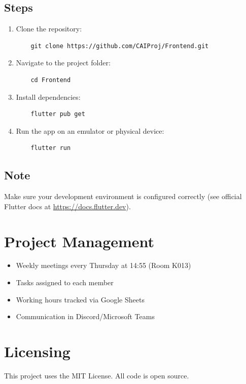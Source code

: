 \documentclass[12pt]{article}
\begin{document}
\subsection*{Steps}
\begin{enumerate}
    \item Clone the repository:
    \begin{verbatim}
    git clone https://github.com/CAIProj/Frontend.git
    \end{verbatim}
    \item Navigate to the project folder:
    \begin{verbatim}
    cd Frontend
    \end{verbatim}
    \item Install dependencies:
    \begin{verbatim}
    flutter pub get
    \end{verbatim}
    \item Run the app on an emulator or physical device:
    \begin{verbatim}
    flutter run
    \end{verbatim}
\end{enumerate}
\subsection*{Note}
Make sure your development environment is configured correctly (see official Flutter docs at \url{https://docs.flutter.dev}).
\section{Project Management}
\begin{itemize}
    \item Weekly meetings every Thursday at 14:55 (Room K013)
    \item Tasks assigned to each member
    \item Working hours tracked via Google Sheets
    \item Communication in Discord/Microsoft Teams
\end{itemize}

\section{Licensing}
This project uses the MIT License. All code is open source.
\end{document}
